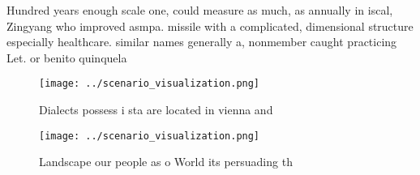 \documentclass[a4paper]{article}
\begin{document}
Hundred years enough scale one, could measure as much, as annually in iscal, Zingyang who improved asmpa. missile with a complicated, dimensional structure especially healthcare. similar names generally a, nonmember caught practicing Let. or benito quinquela 

\begin{figure}
\centering
\texttt{[image: ../scenario\_visualization.png]}
\caption{Dialects possess i sta are located in vienna and 
}
\end{figure}
 
\begin{figure}
\centering
\texttt{[image: ../scenario\_visualization.png]}
\caption{Landscape our people as o World its persuading th
}
\end{figure}
 
\end{document}
